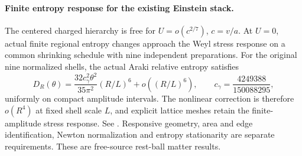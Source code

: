 \paragraph{Finite entropy response for the existing Einstein stack.}
The centered charged hierarchy is free for $U=o(c^{2/7})$, $c=v/a$.
At $U=0$, actual finite regional entropy changes approach the Weyl stress
response on a common shrinking schedule with nine independent preparations.
For the original nine normalized shells, the actual Araki relative entropy satisfies
\[
D_R(\theta)=\frac{32c_\gamma^2\theta^2}{35\pi^2}(R/L)^6+o((R/L)^6),
\qquad c_\gamma=\frac{4249388}{150088295},
\]
uniformly on compact amplitude intervals.
The nonlinear correction is therefore $o(R^4)$ at fixed shell scale $L$,
and explicit lattice meshes retain the finite-amplitude stress response.
See .
Responsive geometry, area and edge identification, Newton normalization
and entropy stationarity are separate requirements. These are free-source
rest-ball matter results.
